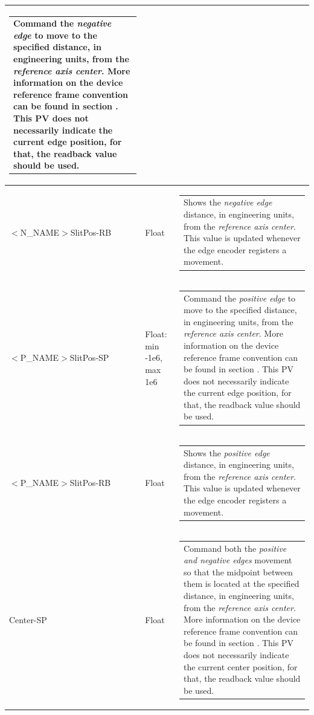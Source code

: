 \documentclass[openany]{article}
\begin{document}
\begin{longtable}{| m{4.5cm} m{2.5cm}  m{7.0cm} |}
\begin{tabular}{@{}m{6cm}@{}}
                Command the \emph{negative edge} to move to the specified distance, in engineering units, from the \emph{reference axis center}. More information on the device reference frame convention can be found in section \nameref{sec:dev-reference-frame}. This PV does not necessarily indicate the current edge position, for that, the readback value should be used.
            \end{tabular} \hypertarget{}{}\\ \hline
        $<$N\_NAME$>$SlitPos-RB & Float & \begin{tabular}{@{}m{6cm}@{}}
                Shows the \emph{negative edge} distance, in engineering units, from the \emph{reference axis center}. This value is updated whenever the edge encoder registers a movement.
            \end{tabular} \hypertarget{pv:positive-edge-pos}{}\\ \hline
        $<$P\_NAME$>$SlitPos-SP & Float: min -1e6, max 1e6 & \begin{tabular}{@{}m{6cm}@{}}
                Command the \emph{positive edge} to move to the specified distance, in engineering units, from the \emph{reference axis center}. More information on the device reference frame convention can be found in section \nameref{sec:dev-reference-frame}. This PV does not necessarily indicate the current edge position, for that, the readback value should be used.
            \end{tabular} \hypertarget{}{}\\ \hline
        $<$P\_NAME$>$SlitPos-RB & Float & \begin{tabular}{@{}m{6cm}@{}}
                Shows the \emph{positive edge} distance, in engineering units, from the \emph{reference axis center}. This value is updated whenever the edge encoder registers a movement.
            \end{tabular} \hypertarget{pv:center}{}\\ \hline
        Center-SP & Float & \begin{tabular}{@{}m{6cm}@{}}
                Command both the \emph{positive and negative edges} movement so that the midpoint between them is located at the specified distance, in engineering units, from the \emph{reference axis center}. More information on the device reference frame convention can be found in section \nameref{sec:dev-reference-frame}. This PV does not necessarily indicate the current center position, for that, the readback value should be used.

\end{tabular}
\end{longtable}
\end{document}
